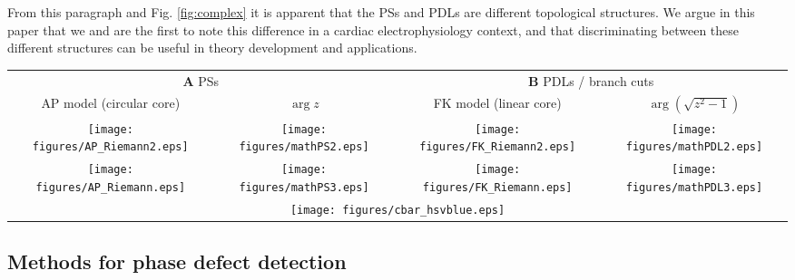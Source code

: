 \documentclass[aps,pre,amsfonts,amssymb,amsmath,twocolumn, superscriptaddress]{revtex4-1}
\makeatletter
\newcommand{\STAB}[1]{\begin{tabular}{@{}c@{}}#1\end{tabular}}
\makeatother
\begin{document}
From this paragraph and Fig. \ref{fig:complex} it is apparent that the PSs and PDLs are different topological structures. We argue in this paper that we and \cite{Tomii:2021} are the first to note this difference in a cardiac electrophysiology context, and that discriminating between these different structures can be useful in theory development and applications. 

\newcommand{\fs}{0.2}
\begin{figure*}[t] %
\begin{tabular}{cc|cc}
\multicolumn{2}{c}{\textbf{A} PSs} & 
\multicolumn{2}{c}{\textbf{B} PDLs / branch cuts} \\
AP model (circular core) & $\arg{z}$
& FK model (linear core) & $\arg(\sqrt{z^2-1})$ \\
\texttt{[image: figures/AP\_Riemann2.eps]}&
\texttt{[image: figures/mathPS2.eps]}&
\texttt{[image: figures/FK\_Riemann2.eps]} &
\texttt{[image: figures/mathPDL2.eps]} \\
 \texttt{[image: figures/AP\_Riemann.eps]}&
  \texttt{[image: figures/mathPS3.eps]}&
  \texttt{[image: figures/FK\_Riemann.eps]} &
  \texttt{[image: figures/mathPDL3.eps]} \\
  \multicolumn{4}{c}{
\texttt{[image: figures/cbar\_hsvblue.eps]}
}
\end{tabular}
\caption{ PSs versus PDLs in cardiac models and complex analysis. Phases are rendered in-plane (top row) and in 3D, as a Riemannian surface (bottom row). (A) Rigidly rotating spirals, as in the Aliev-Panfilov (AP) reaction-diffusion model \citep{Aliev:1996} correspond to a PS (gray), similar to the mathematical function $\phi(x,y) = \arg(z)$ shown to the right of it. (B) Linear-core cardiac models, e.g. \citep{Fenton:1998} exhibit a PDL or branch cut (black/gray), like the mathematical function $w=f(z) = \arg(\sqrt{z^2-1})$ shown to the right of it. Gray areas denote a jump in the phase over a quantity not equal to an integer multiple of $2\pi$, i.e. a PDL (physics) or branch cut (mathematics). 
}\label{fig:complex}
\end{figure*}

\subsection{Methods for phase defect detection} \label{sec:PDLdetection}
\end{document}
